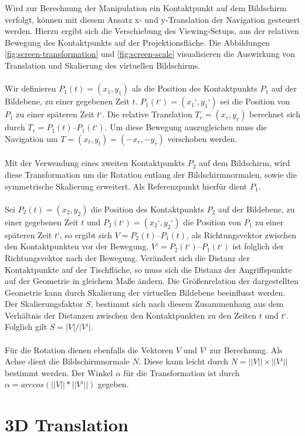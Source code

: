 Wird zur Berechnung der Manipulation ein Kontaktpunkt auf dem Bildschirm verfolgt, können mit diesem Ansatz x- und y-Translation der Navigation gesteuert werden. Hierzu ergibt sich die Verschiebung des Viewing-Setups, aus der relativen Bewegung des Kontaktpunkts auf der Projektionsfläche. Die Abbildungen \ref{fig:screen-transformation} und \ref{fig:screen-scale} visualisieren die Auswirkung von Translation und Skalierung des virtuellen Bildschirms.
\\\\
Wir definieren $P_1(t) = (x_1, y_1)$ als die Position des Kontaktpunkts $P_1$ auf der Bildebene, zu einer gegebenen Zeit $t$. $P_1(t‘) = (x_1‘, y_1‘)$ sei die Position von $P_1$ zu einer späteren Zeit $t‘$. Die relative Translation $T_r = (x_r, y_r)$ berechnet sich durch $T_r = P_1(t) – P_1(t‘)$. Um diese Bewegung auszugleichen muss die Navigation um $T = (x_t, y_t) = (-x_r, -y_r)$ verschoben werden.
\\\\
Mit der Verwendung eines zweiten Kontaktpunkts $P_2$ auf dem Bildschirm, wird diese Transformation um die Rotation entlang der Bildschirmnormalen, sowie die symmetrische Skalierung erweitert. Als Referenzpunkt hierfür dient $P_1$.
\\\\
Sei $P_2(t) = (x_2, y_2)$ die Position des Kontaktpunkts $P_2$ auf der Bildebene, zu einer gegebenen Zeit $t$ und $P_2(t‘) = (x_2‘, y_2‘)$ die Position von $P_1$ zu einer späteren Zeit $t‘$, so ergibt sich $V = P_2(t) – P_1(t)$, als Richtungsvektor zwischen den Kontaktpunkten vor der Bewegung. $V‘ = P_2(t‘) – P_1(t‘)$ ist folglich der Richtungsvektor nach der Bewegung. Verändert sich die Distanz der Kontaktpunkte auf der Tischfläche, so muss sich die Distanz der Angriffspunkte auf der Geometrie in gleichem Maße ändern. Die Größenrelation der dargestellten Geometrie kann durch Skalierung der virtuellen Bildebene beeinflusst werden. Der Skalierungsfaktor $S$, bestimmt sich nach diesem Zusammenhang aus dem Verhältnis der Distanzen zwischen den Kontaktpunkten zu den Zeiten $t$ und $t‘$. Folglich gilt $S = |V| / |V‘|$. 
\\\\
Für die Rotation dienen ebenfalls die Vektoren $V$ und $V‘$ zur Berechnung. Als Achse dient die Bildschirmnormale $N$. Diese kann leicht durch $N = ||V|| \times ||V‘||$ bestimmt werden. Der Winkel $\alpha$ für die Transformation ist durch $\alpha = arccos(||V|| * ||V‘||)$ gegeben.


\section{3D Translation}
\label{sec:3d_translation}

